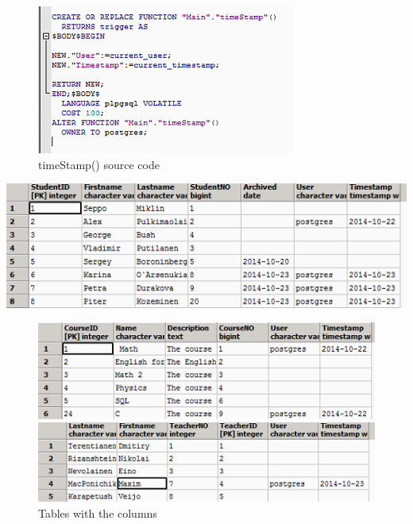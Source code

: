 \documentclass[english]{article}
\begin{document}
\begin{figure}[h!]
\centerline{\includegraphics{PLPGSQL/SourceTimeStamp}}
\caption{timeStamp() source code}
\end{figure}
\centerline{\includegraphics{PLPGSQL/studentTable}}
\begin{figure}[h!]

\centerline{\includegraphics{PLPGSQL/courseTable}}
\centerline{\includegraphics{PLPGSQL/teacherTable}}
\caption{Tables with the columns}
\end{figure}
\newpage
\end{document}
